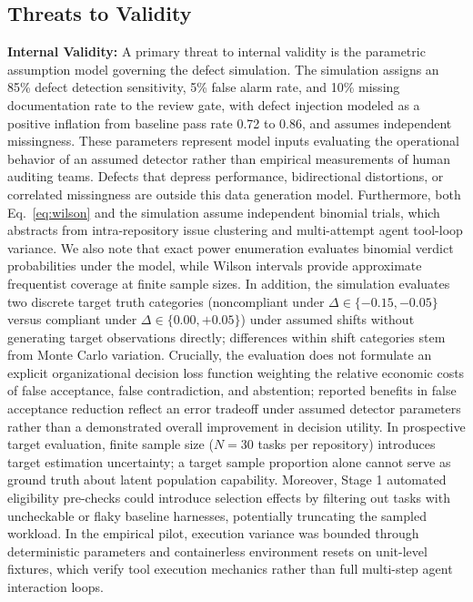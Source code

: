 \documentclass[runningheads]{llncs}
\begin{document}
\subsection{Threats to Validity}
\textbf{Internal Validity:} A primary threat to internal validity is the parametric assumption model governing the defect simulation. The simulation assigns an 85\% defect detection sensitivity, 5\% false alarm rate, and 10\% missing documentation rate to the review gate, with defect injection modeled as a positive inflation from baseline pass rate 0.72 to 0.86, and assumes independent missingness. These parameters represent model inputs evaluating the operational behavior of an assumed detector rather than empirical measurements of human auditing teams. Defects that depress performance, bidirectional distortions, or correlated missingness are outside this data generation model. Furthermore, both Eq.~\ref{eq:wilson} and the simulation assume independent binomial trials, which abstracts from intra-repository issue clustering and multi-attempt agent tool-loop variance. We also note that exact power enumeration evaluates binomial verdict probabilities under the model, while Wilson intervals provide approximate frequentist coverage at finite sample sizes. In addition, the simulation evaluates two discrete target truth categories (noncompliant under $\Delta \in \{-0.15, -0.05\}$ versus compliant under $\Delta \in \{0.00, +0.05\}$) under assumed shifts without generating target observations directly; differences within shift categories stem from Monte Carlo variation. Crucially, the evaluation does not formulate an explicit organizational decision loss function weighting the relative economic costs of false acceptance, false contradiction, and abstention; reported benefits in false acceptance reduction reflect an error tradeoff under assumed detector parameters rather than a demonstrated overall improvement in decision utility. In prospective target evaluation, finite sample size ($N = 30$ tasks per repository) introduces target estimation uncertainty; a target sample proportion alone cannot serve as ground truth about latent population capability. Moreover, Stage 1 automated eligibility pre-checks could introduce selection effects by filtering out tasks with uncheckable or flaky baseline harnesses, potentially truncating the sampled workload. In the empirical pilot, execution variance was bounded through deterministic parameters and containerless environment resets on unit-level fixtures, which verify tool execution mechanics rather than full multi-step agent interaction loops.
\end{document}
